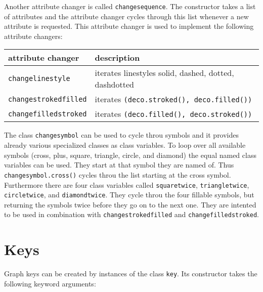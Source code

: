 Another attribute changer is called \verb|changesequence|. The
constructor takes a list of attributes and the attribute changer
cycles through this list whenever a new attribute is requested.
This attribute changer is used to implement the following attribute
changers:

\begin{center}
\begin{tabular}{ll}
attribute changer&description\\
\hline
\texttt{changelinestyle}&iterates linestyles solid, dashed, dotted, dashdotted\\
\texttt{changestrokedfilled}&iterates \texttt{(deco.stroked(), deco.filled())}\\
\texttt{changefilledstroked}&iterates \texttt{(deco.filled(), deco.stroked())}\\
\end{tabular}
\end{center}

The class \verb|changesymbol| can be used to cycle throu symbols and it
provides already various specialized classes as class variables. To
loop over all available symbols (cross, plus, square, triangle,
circle, and diamond) the equal named class variables can be used. They
start at that symbol they are named of. Thus \verb|changesymbol.cross()|
cycles throu the list starting at the cross symbol. Furthermore
there are four class variables called \verb|squaretwice|,
\verb|triangletwice|, \verb|circletwice|, and \verb|diamondtwice|.
They cycle throu the four fillable symbols, but returning the symbols
twice before they go on to the next one. They are intented to be used
in combination with \verb|changestrokedfilled| and
\verb|changefilledstroked|.

\section{Keys}

Graph keys can be created by instances of the class \verb|key|. Its
constructor takes the following keyword arguments:

